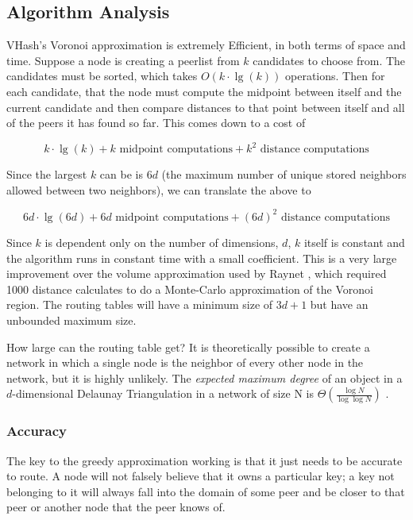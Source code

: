 \documentclass{IEEEtran}
\begin{document}
\subsection{Algorithm Analysis}
VHash's Voronoi approximation is extremely Efficient, in both terms of space and time.  Suppose a node is creating a peerlist from $k$ candidates to choose from.  The candidates must be sorted, which takes $O(k\cdot\lg(k))$ operations.  Then for each candidate, that the node must compute the midpoint between itself and the current candidate and then compare distances to that point between itself and all of the peers it has found so far.  This comes down to a cost of 

\[ k\cdot\lg(k) + k \text{ midpoint computations}  + k^{2} \text{ distance computations} \]



Since the largest $k$ can be is  $6d$  (the maximum number of unique stored neighbors allowed between two neighbors), we can translate the above to

\[6d\cdot\lg(6d) + 6d \text{ midpoint computations}  + (6d)^{2} \text{ distance computations}\]


Since $k$ is dependent only on the number of dimensions, $d$, $k$ itself is constant and the algorithm runs in constant time with a small coefficient.  This is a very large improvement over the volume approximation used by Raynet \cite{raynet}, which required 1000 distance calculates to do a Monte-Carlo approximation of the Voronoi region.  The routing tables will have a minimum size of $3d+1$ but have an unbounded maximum size. 

How large can the routing table get?  It is theoretically possible to create a network in which a single node is the neighbor of every other node in the network, but it is highly unlikely. The \textit{expected maximum degree} of an object in a $d$-dimensional Delaunay Triangulation in a network of size N is $\Theta(\frac{\log N}{\log \log N} )$ \cite{bern1991expected}.


\subsubsection*{Accuracy}

The key to the greedy approximation working is that it just needs to be accurate to route.  A node will not falsely believe that it owns a particular key; a key not belonging to it will always fall into the domain of some peer and be closer to that peer or another node that the peer knows of.
\end{document}
